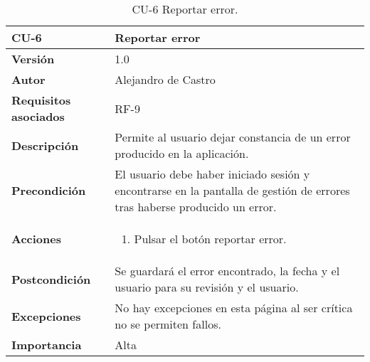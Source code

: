 \begin{table}[p]
	\centering
	\begin{tabularx}{\linewidth}{ p{} p{} }
		\toprule
		\textbf{CU-6}    & \textbf{Reportar error}\\
		\toprule
		\textbf{Versión}              & 1.0    \\
		\textbf{Autor}                & {Alejandro de Castro} \\
		\textbf{Requisitos asociados} & RF-9 \\
		\textbf{Descripción}          & Permite al usuario dejar constancia de un error producido en la aplicación. \\
		\textbf{Precondición}         & El usuario debe haber iniciado sesión y encontrarse en la pantalla de gestión de errores tras haberse producido un error. \\
        \textbf{Acciones}             &
		\begin{enumerate}
			\def\labelenumi{\arabic{enumi}.}
			\tightlist
			\item Pulsar el botón reportar error.
		\end{enumerate}\\ 
		\textbf{Postcondición}        & Se guardará el error encontrado, la fecha y el usuario para su revisión y el usuario. \\
		\textbf{Excepciones}          & No hay excepciones en esta página al ser crítica no se permiten fallos. \\
		\textbf{Importancia}          & Alta \\
		\bottomrule
	\end{tabularx}
	\caption{CU-6 Reportar error.}
\end{table}

